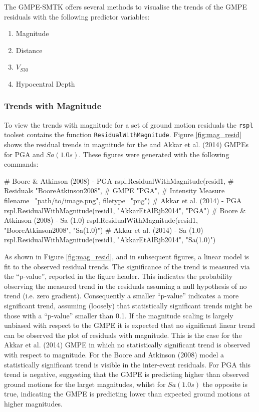 The GMPE-SMTK offers several methods to visualise the trends of the GMPE residuals with the following predictor variables:
\begin{enumerate}
\item Magnitude
\item Distance
\item $V_{S30}$
\item Hypocentral Depth
\end{enumerate}

\subsubsection{Trends with Magnitude}

To view the trends with magnitude for a set of ground motion residuals the \verb=rspl= toolset contains the function \verb=ResidualWithMagnitude=. Figure \ref{fig:mag_resid} shows the residual trends in magnitude for the \cite{boore2008} and Akkar et al. (2014) GMPEs for PGA and $Sa \left( {1.0 s} \right)$. These figures were generated with the following commands:

\begin{python}[frame=single]
# Boore & Atkinson (2008)  - PGA
rspl.ResidualWithMagnitude(resid1,  # Residuals
                           "BooreAtkinson2008",  # GMPE
                           "PGA",   # Intensity Measure
                           filename="path/to/image.png",
                           filetype="png")
# Akkar et al. (2014)  - PGA
rspl.ResidualWithMagnitude(resid1, "AkkarEtAlRjb2014", "PGA") 
# Boore & Atkinson (2008)  - Sa (1.0)
rspl.ResidualWithMagnitude(resid1, "BooreAtkinson2008",
                          "Sa(1.0)") 
# Akkar et al. (2014)  - Sa (1.0)
rspl.ResidualWithMagnitude(resid1, "AkkarEtAlRjb2014",
                          "Sa(1.0)")                         
\end{python}

As shown in Figure \ref{fig:mag_resid}, and in subsequent figures, a linear model is fit to the observed residual trends. The significance of the trend is measured via the ``p-value'', reported in the figure header. This indicates the probability observing the measured trend in the residuals assuming a null hypothesis of no trend (i.e. zero gradient). Consequently a smaller ``p-value'' indicates a more significant trend, assuming (loosely) that statistically significant trends might be those with a ``p-value'' smaller than 0.1. If the magnitude scaling is largely unbiased with respect to the GMPE it is expected that no significant linear trend can be observed the plot of residuals with magnitude. This is the case for the Akkar et al. (2014) GMPE in which no statistically significant trend is observed with respect to magnitude. For the Boore and Atkinson (2008) model a statistically significant trend is visible in the inter-event residuals. For PGA this trend is negative, suggesting that the GMPE is predicting higher than observed ground motions for the larget magnitudes, whilst for $Sa \left( {1.0 s} \right)$ the opposite is true, indicating the GMPE is predicting lower than expected ground motions at higher magnitudes.


